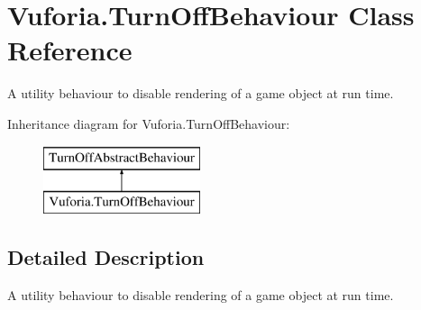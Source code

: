 \hypertarget{class_vuforia_1_1_turn_off_behaviour}{}\section{Vuforia.\+Turn\+Off\+Behaviour Class Reference}
\label{class_vuforia_1_1_turn_off_behaviour}


A utility behaviour to disable rendering of a game object at run time.  


Inheritance diagram for Vuforia.\+Turn\+Off\+Behaviour\+:\begin{figure}[H]
\begin{center}
\leavevmode
\includegraphics[height=2.000000cm]{class_vuforia_1_1_turn_off_behaviour}
\end{center}
\end{figure}


\subsection{Detailed Description}
A utility behaviour to disable rendering of a game object at run time. 

